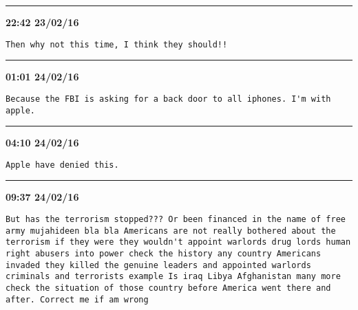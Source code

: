 \hrule%

\begin{adjustwidth}{0cm}{0cm}
\footnotesize \textbf{22:42 23/02/16}

\begin{lstlisting}[breaklines, breakatwhitespace, basicstyle=\small, frame=leftline]
Then why not this time, I think they should!!
\end{lstlisting}
\end{adjustwidth}

\hrule%

\begin{adjustwidth}{0cm}{0cm}
\footnotesize \textbf{01:01 24/02/16}

\begin{lstlisting}[breaklines, breakatwhitespace, basicstyle=\small, frame=leftline]
Because the FBI is asking for a back door to all iphones. I'm with apple.
\end{lstlisting}
\end{adjustwidth}

\hrule%

\begin{adjustwidth}{0cm}{0cm}
\footnotesize \textbf{04:10 24/02/16}

\begin{lstlisting}[breaklines, breakatwhitespace, basicstyle=\small, frame=leftline]
Apple have denied this.
\end{lstlisting}
\end{adjustwidth}

\hrule%

\begin{adjustwidth}{0cm}{0cm}
\footnotesize \textbf{09:37 24/02/16}

\begin{lstlisting}[breaklines, breakatwhitespace, basicstyle=\small, frame=leftline]
But has the terrorism stopped??? Or been financed in the name of free army mujahideen bla bla Americans are not really bothered about the terrorism if they were they wouldn't appoint warlords drug lords human right abusers into power check the history any country Americans invaded they killed the genuine leaders and appointed warlords criminals and terrorists example Is iraq Libya Afghanistan many more check the situation of those country before America went there and after. Correct me if am wrong
\end{lstlisting}
\end{adjustwidth}

